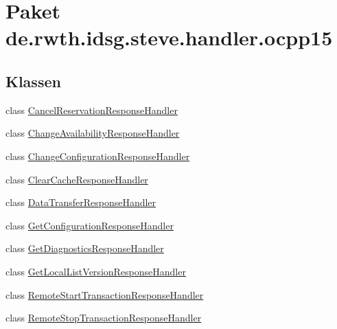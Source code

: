 \hypertarget{namespacede_1_1rwth_1_1idsg_1_1steve_1_1handler_1_1ocpp15}{\section{Paket de.\-rwth.\-idsg.\-steve.\-handler.\-ocpp15}
\label{namespacede_1_1rwth_1_1idsg_1_1steve_1_1handler_1_1ocpp15}
}
\subsection*{Klassen}
\begin{DoxyCompactItemize}
\item 
class \hyperlink{classde_1_1rwth_1_1idsg_1_1steve_1_1handler_1_1ocpp15_1_1_cancel_reservation_response_handler}{Cancel\-Reservation\-Response\-Handler}
\item 
class \hyperlink{classde_1_1rwth_1_1idsg_1_1steve_1_1handler_1_1ocpp15_1_1_change_availability_response_handler}{Change\-Availability\-Response\-Handler}
\item 
class \hyperlink{classde_1_1rwth_1_1idsg_1_1steve_1_1handler_1_1ocpp15_1_1_change_configuration_response_handler}{Change\-Configuration\-Response\-Handler}
\item 
class \hyperlink{classde_1_1rwth_1_1idsg_1_1steve_1_1handler_1_1ocpp15_1_1_clear_cache_response_handler}{Clear\-Cache\-Response\-Handler}
\item 
class \hyperlink{classde_1_1rwth_1_1idsg_1_1steve_1_1handler_1_1ocpp15_1_1_data_transfer_response_handler}{Data\-Transfer\-Response\-Handler}
\item 
class \hyperlink{classde_1_1rwth_1_1idsg_1_1steve_1_1handler_1_1ocpp15_1_1_get_configuration_response_handler}{Get\-Configuration\-Response\-Handler}
\item 
class \hyperlink{classde_1_1rwth_1_1idsg_1_1steve_1_1handler_1_1ocpp15_1_1_get_diagnostics_response_handler}{Get\-Diagnostics\-Response\-Handler}
\item 
class \hyperlink{classde_1_1rwth_1_1idsg_1_1steve_1_1handler_1_1ocpp15_1_1_get_local_list_version_response_handler}{Get\-Local\-List\-Version\-Response\-Handler}
\item 
class \hyperlink{classde_1_1rwth_1_1idsg_1_1steve_1_1handler_1_1ocpp15_1_1_remote_start_transaction_response_handler}{Remote\-Start\-Transaction\-Response\-Handler}
\item 
class \hyperlink{classde_1_1rwth_1_1idsg_1_1steve_1_1handler_1_1ocpp15_1_1_remote_stop_transaction_response_handler}{Remote\-Stop\-Transaction\-Response\-Handler}

\end{DoxyCompactItemize}
